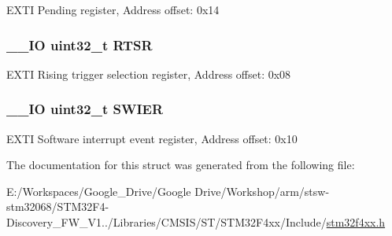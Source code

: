 E\-X\-T\-I Pending register, Address offset\-: 0x14 \hypertarget{struct_e_x_t_i___type_def_a0d952a17455687d6e9053730d028fa1d}{
\subsubsection[{R\-T\-S\-R}]{\setlength{\rightskip}{0pt plus 5cm}\-\_\-\-\_\-\-I\-O uint32\-\_\-t R\-T\-S\-R}}\label{struct_e_x_t_i___type_def_a0d952a17455687d6e9053730d028fa1d}
E\-X\-T\-I Rising trigger selection register, Address offset\-: 0x08 \hypertarget{struct_e_x_t_i___type_def_a9eae93b6cc13d4d25e12f2224e2369c9}{
\subsubsection[{S\-W\-I\-E\-R}]{\setlength{\rightskip}{0pt plus 5cm}\-\_\-\-\_\-\-I\-O uint32\-\_\-t S\-W\-I\-E\-R}}\label{struct_e_x_t_i___type_def_a9eae93b6cc13d4d25e12f2224e2369c9}
E\-X\-T\-I Software interrupt event register, Address offset\-: 0x10 

The documentation for this struct was generated from the following file\-:\begin{DoxyCompactItemize}
\item 
E\-:/\-Workspaces/\-Google\-\_\-\-Drive/\-Google Drive/\-Workshop/arm/stsw-\/stm32068/\-S\-T\-M32\-F4-\/\-Discovery\-\_\-\-F\-W\-\_\-\-V1../\-Libraries/\-C\-M\-S\-I\-S/\-S\-T/\-S\-T\-M32\-F4xx/\-Include/\hyperlink{stm32f4xx_8h}{stm32f4xx.\-h}\end{DoxyCompactItemize}
